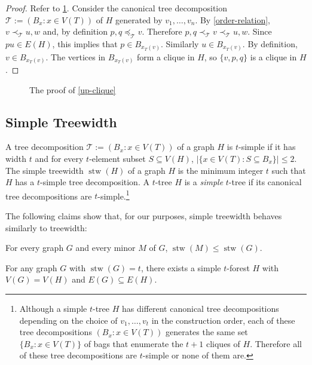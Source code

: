 \documentclass[kpfonts]{patmorin}
\DeclareMathOperator{\stw}{stw}
\theoremstyle{named}
\begin{document}
\begin{proof}
    Refer to \cref{up-clique-figure}. Consider the canonical tree decomposition $\mathcal{T}:=(B_x:x\in V(T))$ of $H$ generated by $v_1,\ldots,v_n$.  By \cref{order-relation}, $v\prec_{\mathcal{T}} u,w$ and, by definition $p,q\preceq_{\mathcal{T}} v$.  Therefore $p,q\prec_{\mathcal{T}} v\prec_{\mathcal{T}} u,w$.  Since $pu\in E(H)$, this implies that $p\in B_{x_T(v)}$.  Similarly $u\in B_{x_T(v)}$.  By definition, $v\in B_{x_T(v)}$.  The vertices in $B_{x_T(v)}$ form a clique in $H$, so $\{v,p,q\}$ is a clique in $H$.
\end{proof}

\begin{figure}
    \caption{The proof of \cref{up-clique}}
    \label{up-clique-figure}
\end{figure}

\subsection{Simple Treewidth}


A tree decomposition $\mathcal{T}:=(B_x:x\in V(T))$ of a graph $H$ is $t$-simple if it has width $t$ and for every $t$-element subset $S\subseteq V(H)$, $|\{x\in V(T):S\subseteq B_x\}|\le 2$.  The simple treewidth $\stw(H)$ of a graph $H$ is the minimum integer $t$ such that $H$ has a $t$-simple tree decomposition.  A $t$-tree $H$ is a \emph{simple} $t$-tree if its canonical tree decompositions are $t$-simple.\footnote{Although a simple $t$-tree $H$ has different canonical tree decompositions depending on the choice of $v_1,\ldots,v_t$ in the construction order, each of these tree decompositions $(B_x:x\in V(T))$ generates the same set $\{B_x:x\in V(T)\}$ of bags that enumerate the $t+1$ cliques of $H$.  Therefore all of these tree decompositions are $t$-simple or none of them are.}

The following claims show that, for our purposes, simple treewidth behaves similarly to treewidth:

\begin{clm}\label{simple-minor-closed}
    For every graph $G$ and every minor $M$ of $G$, $\stw(M)\le\stw(G)$.
\end{clm}

\begin{clm}\label{simple-subgraph}
    For any graph $G$ with $\stw(G)=t$, there exists a simple $t$-forest $H$ with $V(G)= V(H)$ and $E(G)\subseteq E(H)$.
\end{clm}
\end{document}
